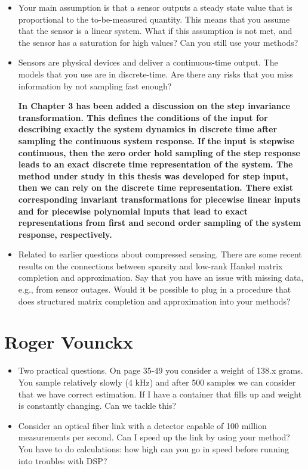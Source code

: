\documentclass[11pt]{article}
\begin{document}
\begin{itemize}
	\item Your main assumption is that a sensor outputs a steady state value that is proportional to the to-be-measured quantity. This means that you assume that the sensor is a linear system. What if this assumption is not met, and the sensor has a saturation for high values? Can you still use your methods?
	\item  Sensors are physical devices and deliver a continuous-time output. The models that you use are in discrete-time. Are there any risks that you miss information by not sampling fast enough?
	
	{\bfseries In Chapter 3 has been added a discussion on the step invariance transformation. This defines the conditions of the input for describing exactly the system dynamics in discrete time after sampling the continuous system response. If the input is stepwise continuous, then the zero order hold sampling of the step response leads to an exact discrete time representation of the system. The method under study in this thesis was developed for step input, then we can rely on the discrete time representation. There exist corresponding invariant transformations for piecewise linear inputs and for piecewise polynomial inputs that lead to exact representations from first and second order sampling of the system response, respectively.  }
	
	\item  Related to earlier questions about compressed sensing. There are some recent results on the connections between sparsity and low-rank Hankel matrix completion and approximation. Say that you have an issue with missing data, e.g., from sensor outages. Would it be possible to plug in a procedure that does structured matrix completion and approximation into your methods?
\end{itemize}

\section*{Roger Vounckx}

\begin{itemize}
	\item Two practical questions. On page 35-49 you consider a weight of 138.x grams. You sample relatively slowly (4 kHz) and after 500 samples we can consider that we have correct estimation. If I have a container that fills up and weight is constantly changing. Can we tackle this?
	\item  Consider an optical fiber link with a detector capable of 100 million measurements per second. Can I speed up the link by using your method? You have to do calculations: how high can you go in speed before running into troubles with DSP?
\end{itemize}
\end{document}
